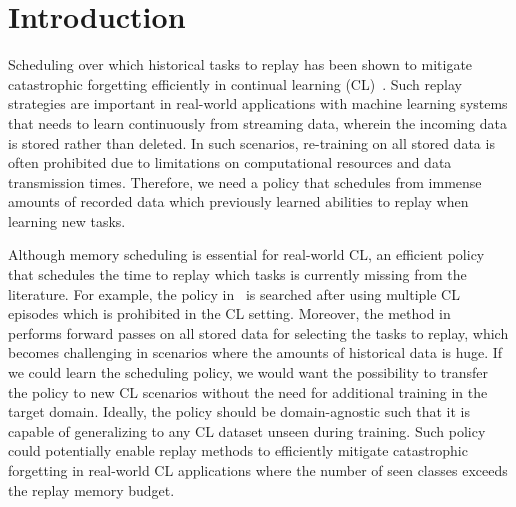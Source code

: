 
\section{Introduction}\label{paperD:sec:introduction}

Scheduling over which historical tasks to replay has been shown to mitigate catastrophic forgetting efficiently in continual learning (CL)~. 
Such replay strategies are important in real-world applications with machine learning systems that needs to learn continuously from streaming data, wherein the incoming data is stored rather than deleted.
In such scenarios, re-training on all stored data is often prohibited due to limitations on computational resources and data transmission times. Therefore, we need a policy that schedules from immense amounts of recorded data which previously learned abilities to replay when learning new tasks. 

Although memory scheduling is essential for real-world CL, an efficient policy that schedules the time to replay which tasks is currently missing from the literature. For example, the policy in~ is searched after using multiple CL episodes which is prohibited in the CL setting. Moreover, the method in~ performs forward passes on all stored data for selecting the tasks to replay, which becomes challenging in scenarios where the amounts of historical data is huge. 
If we could learn the scheduling policy, we would want the possibility to transfer the policy to new CL scenarios without the need for additional training in the target domain. Ideally, the policy should be domain-agnostic such that it is capable of generalizing to any CL dataset unseen during training. Such policy could potentially enable replay methods to efficiently mitigate catastrophic forgetting in real-world CL applications where the number of seen classes exceeds the replay memory budget. 

